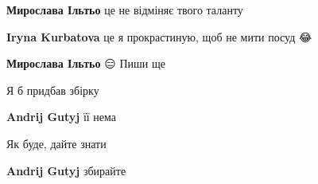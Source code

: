 \begin{itemize}
\begin{itemize}
\textbf{Мирослава Ільтьо} це не відміняє твого таланту🤗

 
\textbf{Iryna Kurbatova} це я прокрастиную, щоб не мити посуд 😂

 
\textbf{Мирослава Ільтьо} 😑
Пиши ще
\end{itemize}

 
Я б придбав збірку

\begin{itemize}
 
\textbf{Andrij Gutyj} її нема \Laughey[1.0][white]

 
Як буде, дайте знати

 
\textbf{Andrij Gutyj} збирайте
\end{itemize}

 

\end{itemize}
